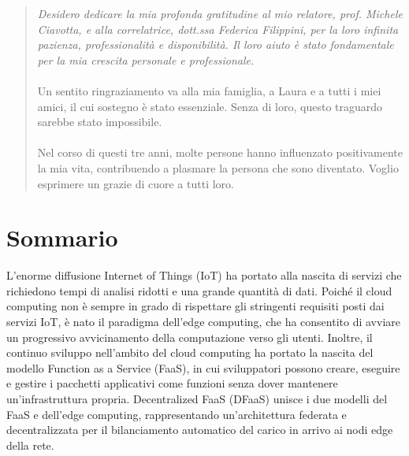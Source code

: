 \begingroup %
\addtolength\leftmargini{1cm} %
\begin{quotation}
    \it
    Desidero dedicare la mia profonda gratitudine al mio relatore, prof. Michele Ciavotta, e alla correlatrice, dott.ssa Federica Filippini, per la loro infinita pazienza, professionalità e disponibilità. Il loro aiuto è stato fondamentale per la mia crescita personale e professionale.

    \paragraph{} Un sentito ringraziamento va alla mia famiglia, a Laura e a tutti i miei amici, il cui sostegno è stato essenziale. Senza di loro, questo traguardo sarebbe stato impossibile.

    \paragraph{} Nel corso di questi tre anni, molte persone hanno influenzato positivamente la mia vita, contribuendo a plasmare la persona che sono diventato. Voglio esprimere un grazie di cuore a tutti loro.
\end{quotation}
\endgroup

\cleardoublepage

\section*{Sommario}

L'enorme diffusione Internet of Things (IoT) ha portato alla nascita di servizi che richiedono tempi di analisi ridotti e una grande quantità di dati. Poiché il cloud computing non è sempre in grado di rispettare gli stringenti requisiti posti dai servizi IoT, è nato il paradigma dell'edge computing, che ha consentito di avviare un progressivo avvicinamento della computazione verso gli utenti. Inoltre, il continuo sviluppo nell'ambito del cloud computing ha portato la nascita del modello Function as a Service (FaaS), in cui sviluppatori possono creare, eseguire e gestire i pacchetti applicativi come funzioni senza dover mantenere un'infrastruttura propria. Decentralized FaaS (DFaaS) unisce i due modelli del FaaS e dell'edge computing, rappresentando un'architettura federata e decentralizzata per il bilanciamento automatico del carico in arrivo ai nodi edge della rete.

